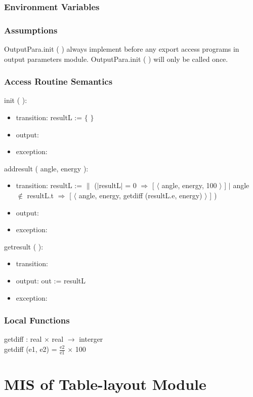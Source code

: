 \documentclass[12pt, titlepage]{article}
\begin{document}
\subsubsection{Environment Variables}


\subsubsection{Assumptions}
OutputPara.init ( ) always implement before any export access programs in output parameters module.
OutputPara.init ( ) will only be called once.

\subsubsection{ Access Routine Semantics}

\noindent  init ( ):
\begin{itemize}
\item transition: resultL := $\{ $ $ \}$
\item output:
\item exception: 
\end{itemize}

\noindent  addresult ( angle, energy ):
\begin{itemize}
\item transition: resultL := $\|$ ($|$resultL$|$ = 0 $\Rightarrow$ [ $\langle$
  angle, energy, 100 $\rangle$ ] $|$ angle $\notin$ resultL.t $\Rightarrow$ [
  $\langle$ angle, energy, getdiff (resultL.e, energy) $\rangle$ ] ) 
\item output:
\item exception: 
\end{itemize}

\noindent  getresult (  ):
\begin{itemize}
\item transition: 
\item output: out := resultL
\item exception: 
\end{itemize}


\subsubsection{Local Functions}
getdiff : real $\times$ real $\rightarrow$ interger\\
getdiff (e1, e2) =
$\frac{\text{e2}}{\text{e1}}$ $\times$ 100


\section{MIS of Table-layout Module} \label{ModuleT} 
\end{document}
